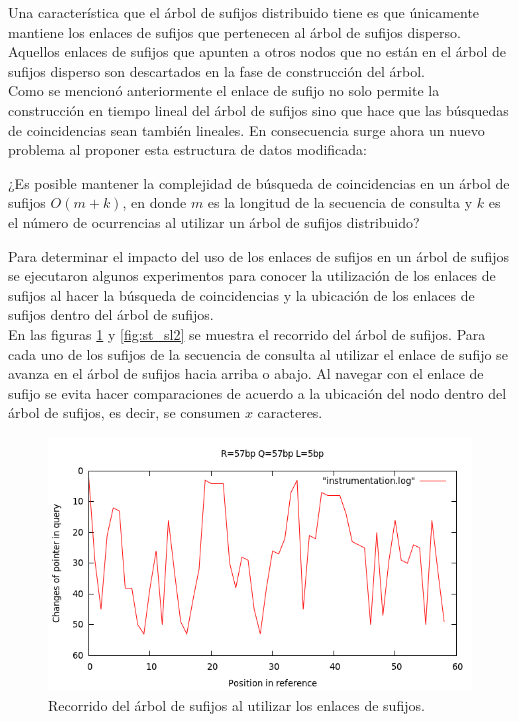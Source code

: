 \documentclass[12pt,a4paper]{article}
\begin{document}
Una característica que el árbol de sufijos distribuido tiene es que únicamente mantiene los enlaces de sufijos que pertenecen al 
árbol de sufijos disperso. Aquellos enlaces de sufijos que apunten a otros nodos que no están en el árbol de sufijos disperso
son descartados en la fase de construcción del árbol.\\
Como se mencionó anteriormente el enlace de sufijo no solo permite la construcción en tiempo lineal del árbol de sufijos sino
que hace que las búsquedas de coincidencias sean tambi\'en lineales. En consecuencia surge ahora un nuevo problema al proponer
esta estructura de datos modificada:\\
\begin{center}
  ¿Es posible mantener la complejidad de búsqueda de coincidencias en un árbol de sufijos $O(m+k)$, en donde $m$ es la
  longitud de la secuencia de consulta y $k$ es el número de ocurrencias al utilizar un árbol de sufijos distribuido?
\end{center}
Para determinar el impacto del uso de los enlaces de sufijos en un árbol de sufijos se ejecutaron algunos experimentos para
conocer la utilización de los enlaces de sufijos al hacer la búsqueda de coincidencias y la ubicación de los enlaces de sufijos
dentro del árbol de sufijos.\\
En las figuras \ref{fig:st_sl} y \ref{fig:st_sl2} se muestra el recorrido del árbol de sufijos. Para cada uno de los sufijos
de la secuencia de consulta al utilizar el enlace de sufijo se avanza en el árbol de sufijos hacia arriba o abajo. Al navegar
con el enlace de sufijo se evita hacer comparaciones de acuerdo a la ubicación del nodo dentro del árbol de sufijos, es decir,
se consumen $x$ caracteres.
\begin{figure}[h]
\begin{center}
\includegraphics[scale=0.4]{r57-q57-l5.png}
\caption{Recorrido del árbol de sufijos al utilizar los enlaces de sufijos.}
\label{fig:st_sl}
\end{center}
\end{figure}
\end{document}
